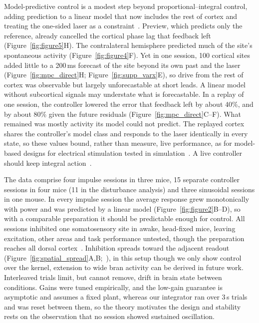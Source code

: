 Model-predictive control is a modest step beyond proportional--integral control, adding prediction to a linear model that now includes the rest of cortex and treating the one-sided laser as a constraint~\citep{mayne2000constrained}.
Preview, which predicts only the reference, already cancelled the cortical phase lag that feedback left (Figure~\ref{fig:figure5}H).
The contralateral hemisphere predicted much of the site's spontaneous activity (Figure~\ref{fig:figure4}F).
Yet in one session, 100 cortical sites added little to a 200\,ms forecast of the site beyond its own past and the laser (Figure~\ref{fig:mpc_direct}H; Figure~\ref{fig:supp_varx}E), so drive from the rest of cortex was observable but largely unforecastable at short leads.
A linear model without subcortical signals may understate what is forecastable.
In a replay of one session, the controller lowered the error that feedback left by about 40\%, and by about 80\% given the future residuals (Figure~\ref{fig:mpc_direct}C--F).
What remained was mostly activity its model could not predict.
The replayed cortex shares the controller's model class and responds to the laser identically in every state, so these values bound, rather than measure, live performance, as for model-based designs for electrical stimulation tested in simulation~\citep{Yang2018,Yang2021}.
A live controller should keep integral action~\citep{pannocchia2003disturbance}.

The data comprise four impulse sessions in three mice, 15 separate controller sessions in four mice (11 in the disturbance analysis) and three sinusoidal sessions in one mouse.
In every impulse session the average response grew monotonically with power and was predicted by a linear model (Figure~\ref{fig:figure2}B--D), so with a comparable preparation it should be predictable enough for control.
All sessions inhibited one somatosensory site in awake, head-fixed mice, leaving excitation, other areas and task performance untested, though the preparation reaches all dorsal cortex~\citep{Matveev2024}.
Inhibition spreads toward the adjacent readout (Figure~\ref{fig:spatial_spread}A,B;~\citealp{li2019spatiotemporal}), in this setup though we only show control over the kernel, extension to wide bran activity can be derived in future work.
Interleaved trials limit, but cannot remove, drift in brain state between conditions.
Gains were tuned empirically, and the low-gain guarantee is asymptotic and assumes a fixed plant, whereas our integrator ran over 3\,s trials and was reset between them, so the theory motivates the design and stability rests on the observation that no session showed sustained oscillation.

